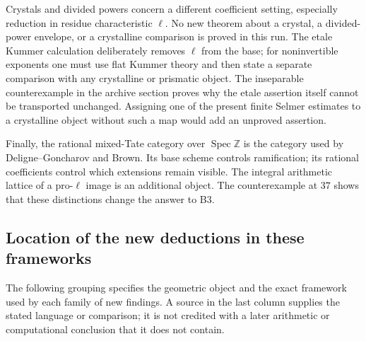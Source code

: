 Crystals and divided powers concern a different coefficient setting,
especially reduction in residue characteristic $\ell$. No new theorem
about a crystal, a divided-power envelope, or a crystalline comparison
is proved in this run. The etale Kummer calculation deliberately removes
$\ell$ from the base; for noninvertible exponents one must use flat
Kummer theory and then state a separate comparison with any crystalline
or prismatic object. The inseparable counterexample in the archive
section proves why the etale assertion itself cannot be transported
unchanged. Assigning one of the present finite Selmer estimates to a
crystalline object without such a map would add an unproved assertion.

Finally, the rational mixed-Tate category over $\operatorname{Spec}
\mathbb Z$ is the category used by Deligne--Goncharov and Brown. Its
base scheme controls ramification; its rational coefficients control
which extensions remain visible. The integral arithmetic lattice of a
pro-$\ell$ image is an additional object. The counterexample at $37$
shows that these distinctions change the answer to B3.

\subsection{Location of the new deductions in these frameworks}

The following grouping specifies the geometric object and the exact
framework used by each family of new findings. A source in the last
column supplies the stated language or comparison; it is not credited
with a later arithmetic or computational conclusion that it does not
contain.

